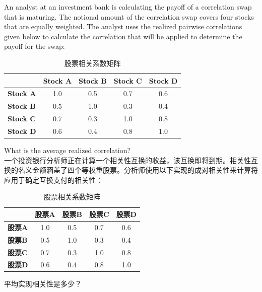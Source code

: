 \documentclass{article}
\newcounter{question} %
\begin{document}
\begin{question}
    An analyst at an investment bank is calculating the payoff of a correlation swap that is maturing. The notional amount of the correlation swap covers four stocks that are equally weighted. The analyst uses the realized pairwise correlations given below to calculate the correlation that will be applied to determine the payoff for the swap:
    \begin{table}[H]
        \centering
        \renewcommand{\arraystretch}{1.2}
        \begin{tabular}{|l|c|c|c|c|}
            \hline
            & \textbf{Stock A} & \textbf{Stock B} & \textbf{Stock C} & \textbf{Stock D} \\
            \hline
            \textbf{Stock A} & 1.0 & 0.5 & 0.7 & 0.6 \\
            \textbf{Stock B} & 0.5 & 1.0 & 0.3 & 0.4 \\
            \textbf{Stock C} & 0.7 &0.3 & 1.0 & 0.8 \\
            \textbf{Stock D} & 0.6 & 0.4 & 0.8 & 1.0 \\
            \hline
        \end{tabular}
        \caption{股票相关系数矩阵}
    \end{table}
    What is the average realized correlation? 
    \\一个投资银行分析师正在计算一个相关性互换的收益，该互换即将到期。相关性互换的名义金额涵盖了四个等权重股票。分析师使用以下实现的成对相关性来计算将应用于确定互换支付的相关性：
    \begin{table}[H]
        \centering
        \renewcommand{\arraystretch}{1.2}
        \begin{tabular}{|l|c|c|c|c|}
            \hline
            & \textbf{股票A} & \textbf{股票B} & \textbf{股票C} & \textbf{股票D} \\
            \hline
            \textbf{股票A} & 1.0 & 0.5 & 0.7 & 0.6 \\
            \textbf{股票B} & 0.5 & 1.0 & 0.3 & 0.4 \\
            \textbf{股票C} & 0.7 &0.3 & 1.0 & 0.8 \\
            \textbf{股票D} & 0.6 & 0.4 & 0.8 & 1.0 \\
            \hline
        \end{tabular}
        \caption{股票相关系数矩阵}
    \end{table}
    平均实现相关性是多少？
\end{question}
\end{document}
